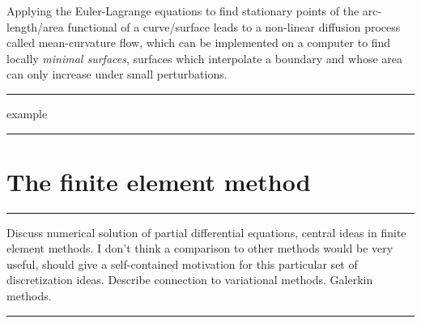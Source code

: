 \documentclass[11pt,a4paper]{memoir}
\newcommand{\todo}[1]{\vskip 0.1in \hrule \vskip 0.03in {#1} \vskip 0.03in \hrule \vskip 0.1in}
\begin{document}
Applying the Euler-Lagrange equations to find stationary points of the arc-length/area functional of a curve/surface
leads to a non-linear diffusion process called mean-curvature flow, which can be implemented on a computer to find
locally \textit{minimal surfaces}, surfaces which interpolate a boundary and whose area can only increase under small perturbations.
\todo{example}

\section{The finite element method}
\todo{
Discuss numerical solution of partial differential equations, central ideas in finite element methods.
I don't think a comparison to other methods would be very useful, should give a self-contained motivation for this particular
set of discretization ideas.
Describe connection to variational methods.
Galerkin methods.
}
\end{document}
